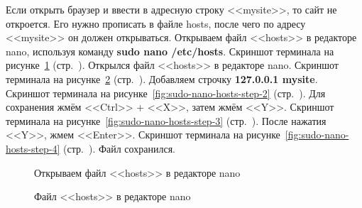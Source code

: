 Если открыть браузер и ввести в адресную строку <<mysite>>, то сайт не откроется.
Его нужно прописать в файле hosts, после чего по адресу <<mysite>> он должен открываться.
Открываем файл <<hosts>> в редакторе nano, используя команду \textbf{sudo nano /etc/hosts}.
Скриншот терминала на рисунке~\ref{fig:sudo-nano-hosts} (стр.~\pageref{fig:sudo-nano-hosts}).
Открылся файл <<hosts>> в редакторе nano.
Скриншот терминала на рисунке~\ref{fig:sudo-nano-hosts-step-1} (стр.~\pageref{fig:sudo-nano-hosts-step-1}).
Добавляем строчку \textbf{127.0.0.1 mysite}.
Скриншот терминала на рисунке~\ref{fig:sudo-nano-hosts-step-2} (стр.~\pageref{fig:sudo-nano-hosts-step-2}).
Для сохранения жмём <<Ctrl>> + <<X>>, затем жмём <<Y>>.
Скриншот терминала на рисунке~\ref{fig:sudo-nano-hosts-step-3} (стр.~\pageref{fig:sudo-nano-hosts-step-3}).
После нажатия <<Y>>, жмем <<Enter>>.
Скриншот терминала на рисунке~\ref{fig:sudo-nano-hosts-step-4} (стр.~\pageref{fig:sudo-nano-hosts-step-4}).
Файл сохранился.

\begin{figure}[p]
    \caption{Открываем файл <<hosts>> в редакторе nano}
    \label{fig:sudo-nano-hosts}
\end{figure}

\begin{figure}[p]
    \caption{Файл <<hosts>> в редакторе nano}
    \label{fig:sudo-nano-hosts-step-1}
\end{figure}

